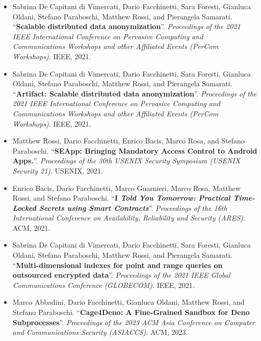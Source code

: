 \begin{itemize}
    \nocite{dffoprs-percom21}
    \item Sabrina De Capitani di Vimercati, Dario Facchinetti, Sara
        Foresti, Gianluca Oldani, Stefano Paraboschi, Matthew Rossi,
        and Pierangela Samarati. ``\textbf{Scalable distributed data
        anonymization}''. {\em Proceedings of the 2021 IEEE
        International Conference on Pervasive Computing and
        Communications Workshops and other Affiliated Events (PerCom
        Workshops)}. IEEE, 2021.
    
    \nocite{dffoprs-percom21-artifact}
    \item Sabrina De Capitani di Vimercati, Dario Facchinetti, Sara
        Foresti, Gianluca Oldani, Stefano Paraboschi, Matthew Rossi,
        and Pierangela Samarati. ``\textbf{Artifact: Scalable
        distributed data anonymization}''. {\em Proceedings of the
        2021 IEEE International Conference on Pervasive Computing and
        Communications Workshops and other Affiliated Events (PerCom
        Workshops)}. IEEE, 2021.

    \nocite{seapp}
    \item Matthew Rossi, Dario Facchinetti, Enrico Bacis, Marco Rosa,
        and Stefano Paraboschi. ``\textbf{SEApp: Bringing Mandatory
        Access Control to Android Apps.}''. {\em Proceedings of the
        30th USENIX Security Symposium (USENIX Security 21)}. USENIX,
        2021.

    \nocite{ityt}
    \item Enrico Bacis, Dario Facchinetti, Marco Guarnieri, Marco
        Rosa, Matthew Rossi, and Stefano Paraboschi. ``\textbf{I \em
        Told You Tomorrow: Practical Time-Locked Secrets using Smart
        Contracts}''. {\em Proceedings of the 16th International
        Conference on Availability, Reliability and Security (ARES)}.
        ACM, 2021.

    \nocite{dffoprs-globecom2021}
    \item Sabrina De Capitani di Vimercati, Dario Facchinetti, Sara
        Foresti, Gianluca Oldani, Stefano Paraboschi, Matthew Rossi,
        and Pierangela Samarati. ``\textbf{Multi-dimensional indexes
        for point and range queries on outsourced encrypted data}''.
        {\em Proceedings of the 2021 IEEE Global Communications
        Conference (GLOBECOM)}. IEEE, 2021.

    \nocite{cage4deno}
    \item Marco Abbadini, Dario Facchinetti, Gianluca Oldani, Matthew
        Rossi, and Stefano Paraboschi. ``\textbf{Cage4Deno: A
        Fine-Grained Sandbox for Deno Subprocesses}''. {\em
        Proceedings of the 2023 ACM Asia Conference on Computer and
        Communications Security (ASIACCS)}. ACM, 2023.


\end{itemize}
